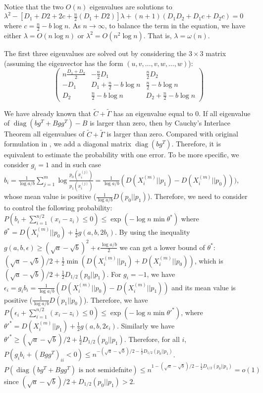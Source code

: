 \documentclass{article}
\DeclareMathOperator{\diag}{diag}
\begin{document}
Notice that the two $O(n)$ eigenvalues are solutions to
$\lambda^2 - [D_1 + D2 + 2c + \frac{n}{2}(D_1 + D2)] \lambda
+ (n+1) (D_1 D_2 + D_1 c + D_2c)=0$ where
$c = \frac{n}{2} - b \log n$. As $n\to \infty$, to balance the term in the equation, we have
either $\lambda = O(n \log n)$ or $\lambda^2 = O(n^2 \log n)$. That is, $\lambda = \omega(n)$.

The first three eigenvalues are solved out by considering the $3\times 3 $
matrix (assuming the eigenvector has the form $(u, v, \dots, v, w, \dots, w)$):
\begin{equation*}
\begin{pmatrix}
n\frac{D_1 + D_2}{2} & -\frac{n}{2} D_1 & \frac{n}{2} D_2 \\
-D_1 & D_1 + \frac{n}{2} - b \log n & \frac{n}{2} - b \log n \\
D_2 & \frac{n}{2} - b \log n & D_2 + \frac{n}{2} - b \log n
\end{pmatrix}
\end{equation*}

We have already known that $\tilde{C}+\tilde{\Gamma}$ has an eigenvalue equal to $0$.
If all eigenvalue of $\diag(bg^T + Bgg^T) - B$ is larger than zero, then by
Cauchy’s Interlace Theorem \cite{it} all eigenvalues of $\tilde{C}+\tilde{\Gamma}$ is larger than zero.
Compared with original formulation in \cite{abbe}, we add a diagonal matrix $\diag(bg^T)$.
Therefore, it is equivalent to estimate the probability with one error.
To be more specific, we consider $g_i = 1$ and in such case
$b_i = \frac{1}{\log a/b}\sum_{j=1}^m \log \frac{p_0(x_i^{(j)})}{p_1(x_i^{(j)})} = \frac{1}{\log a/b}(D(X_i^{(m)} || p_1) - 
D(X_i^{(m)} || p_0)  ))
$, whose mean value is positive ($\frac{1}{\log a/b}D(p_0||p_1)$).
Therefore, we need to consider to control the following probability:
$P(b_i + \sum_{i=1}^{n/2} (x_i - z_i) \leq 0) \leq \exp(-\log n \min \theta^*)$ 
where $\theta^* = D(X_i^{(m)} || p_0) + \frac{1}{2} g(a,b,2b_i)$.
By using the inequality $g(a,b,\epsilon) \geq (\sqrt{a} -\sqrt{b})^2 + \epsilon \frac{\log a/b}{2}$
we can get a lower bound of $\theta^*$: $(\sqrt{a} - \sqrt{b})/2 + \frac{1}{2}\min(D(X_i^{(m)} || p_1) + 
D(X_i^{(m)} || p_0))$, which is $(\sqrt{a} - \sqrt{b})/2 + \frac{1}{2}D_{1/2}(p_0||p_1)$.
For $g_i = -1$, we have $\epsilon_i = g_i b_i = \frac{1}{\log a/b}(D(X_i^{(m)} || p_0) - 
D(X_i^{(m)} || p_1)  )$ and its mean value is positive ($\frac{1}{\log a/b} D(p_1||p_0)$).
Therefore, we have $P(\epsilon_i + \sum_{i=1}^{n/2} (x_i - z_i) \leq 0) \leq \exp(-\log n \min \theta'^*)$,
where $\theta'^* = D(X_i^{(m)}||p_1) + \frac{1}{2}g(a,b,2\epsilon_i)$.
Similarly we have $\theta'^* \geq (\sqrt{a} - \sqrt{b})/2 + \frac{1}{2}D_{1/2}(p_0||p_1)$.
Therefore, for all $i$, $P(g_i b_i + (Bgg^T)_{ii} < 0) \leq n^{-(\sqrt{a} - \sqrt{b})/2 - \frac{1}{2}D_{1/2}(p_0||p_1)}$.
$P(\diag(bg^T + Bgg^T) \textrm{ is not semidefnite}) \leq n^{1-(\sqrt{a} - \sqrt{b})/2 - \frac{1}{2}D_{1/2}(p_0||p_1)} = o(1)$
since $(\sqrt{a} - \sqrt{b})/2 + D_{1/2}(p_0||p_1) > 2$.
\end{document}
